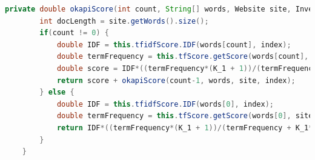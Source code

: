 \begin{lstlisting}[language=Java]
    private double okapiScore(int count, String[] words, Website site, InvertedIndex index) {
        int docLength = site.getWords().size();
        if(count != 0) {
            double IDF = this.tfidfScore.IDF(words[count], index);
            double termFrequency = this.tfScore.getScore(words[count], site, index);
            double score = IDF*((termFrequency*(K_1 + 1))/(termFrequency + K_1*(1 - B + B*(docLength/AVERAGE_DOC_LENGTH))));
            return score + okapiScore(count-1, words, site, index);
        } else {
            double IDF = this.tfidfScore.IDF(words[0], index);
            double termFrequency = this.tfScore.getScore(words[0], site, index);
            return IDF*((termFrequency*(K_1 + 1))/(termFrequency + K_1*(1 - B + B*(docLength/AVERAGE_DOC_LENGTH))));
        }
    }
\end{lstlisting}

